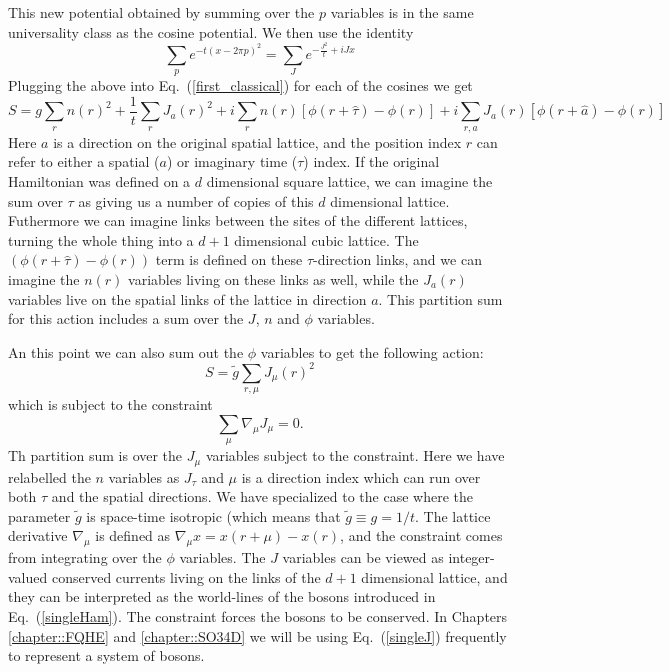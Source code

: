 This new potential obtained by summing over the $p$ variables is in the same universality class as the cosine potential. We then use the identity
\begin{equation}
\sum_p e^{-t(x-2\pi p)^2}=\sum_{J} e^{-\frac{J^2}{t}+iJ x}
\label{Villain2}
\end{equation}
Plugging the above into Eq.~(\ref{first_classical}) for each of the cosines we get
\begin{equation}
S=g\sum_{r} n(r)^2 + \frac{1}{t}\sum_r J_a(r)^2 + i\sum_r n(r) [\phi(r+\hat\tau)-\phi(r)] + i\sum_{r,a} J_{a}(r) [\phi(r+\hat a)-\phi(r)]
\end{equation}
Here $a$ is a direction on the original spatial lattice, and the position index $r$ can refer to either a spatial ($a$) or imaginary time ($\tau$) index. If the original Hamiltonian was defined on a $d$ dimensional square lattice, we can imagine the sum over $\tau$ as giving us a number of copies of this $d$ dimensional lattice. Futhermore we can imagine links between the sites of the different lattices, turning the whole thing into a $d+1$ dimensional cubic lattice. The $(\phi(r+\hat\tau)-\phi(r))$ term is defined on these $\tau$-direction links, and we can imagine the $n(r)$ variables living on these links as well, while the $J_a(r)$ variables live on the spatial links of the lattice in direction $a$. This partition sum for this action includes a sum over the $J$, $n$ and $\phi$ variables.

An this point we can also sum out the $\phi$ variables to get the following action:
\begin{equation}
S=\tilde g\sum_{r,\mu} J_\mu(r)^2
\label{singleJ}
\end{equation}
which is subject to the constraint 
\begin{equation}
\sum_\mu \nabla_\mu J_\mu=0.
\label{constraint}
\end{equation}
Th partition sum is over the $J_\mu$ variables subject to the constraint. Here we have relabelled the $n$ variables as $J_\tau$ and $\mu$ is a direction index which can run over both $\tau$ and the spatial directions. We have specialized to the case where the parameter $\tilde g$ is space-time isotropic (which means that $\tilde{g}\equiv g=1/t$. The lattice derivative $\nabla_\mu$ is defined as $\nabla_\mu x= x(r+\mu)-x(r)$, and the constraint comes from integrating over the $\phi$ variables. The $J$ variables can be viewed as integer-valued conserved currents living on the links of the $d+1$ dimensional lattice, and they can be interpreted as the world-lines of the bosons introduced in Eq.~(\ref{singleHam}). The constraint forces the bosons to be conserved. In Chapters \ref{chapter::FQHE} and \ref{chapter::SO34D} we will be using Eq.~(\ref{singleJ}) frequently to represent a system of bosons.

